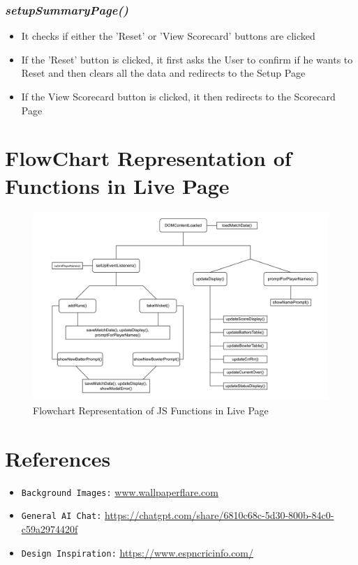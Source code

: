 \documentclass[a4paper,12pt]{article}
\begin{document}
\subsubsection{\textit{setupSummaryPage()}}
\begin{itemize}
\item It checks if either the 'Reset' or 'View Scorecard' buttons are clicked
\item If the 'Reset' button is clicked, it first asks the User to confirm if he wants to Reset and then clears all the data and redirects to the Setup Page 
\item If the View Scorecard button is clicked, it then redirects to the Scorecard Page
\end{itemize} 

\clearpage

\section{FlowChart Representation of Functions in Live Page}
\begin{figure}[h!]
\centering
\includegraphics[width=\textwidth]{images/flowchart.png}
\caption{Flowchart Representation of JS Functions in Live Page} 
\label{flowchart}
\end{figure}

\section{References}
\begin{itemize}
  \item \texttt{Background Images:} \url{www.wallpaperflare.com}
  \item \texttt{General AI Chat:} \url{https://chatgpt.com/share/6810c68c-5d30-800b-84c0-c59a2974420f}
  \item \texttt{Design Inspiration:} \url{https://www.espncricinfo.com/} 
\end{itemize}
\end{document}

